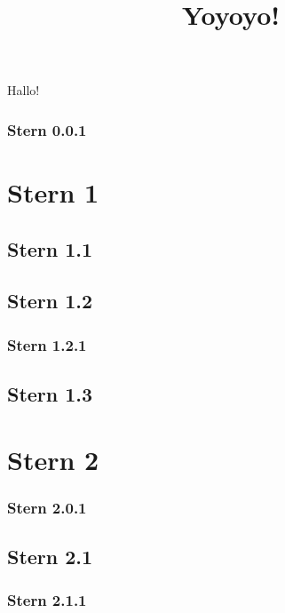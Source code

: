 \documentclass{article}
\title{Yoyoyo!}
\begin{document}
\maketitle
Hallo!
\subsubsection{Stern 0.0.1}
\section{Stern 1}
\subsection{Stern 1.1}
\subsection{Stern 1.2}
\subsubsection{Stern 1.2.1}
\subsection{Stern 1.3}
\section{Stern 2}
\subsubsection{Stern 2.0.1}
\subsection{Stern 2.1}
\subsubsection{Stern 2.1.1}
\end{document}
